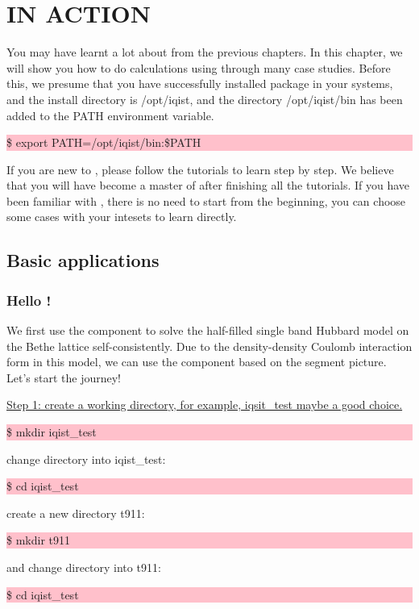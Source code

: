 \chapter{{\iqist} IN ACTION}
You may have learnt a lot about \iqist from the previous chapters. In this chapter, we will show you how to do calculations using \iqist through many case studies. Before this, we presume that you have successfully installed \iqist package in your systems, and the install directory is /opt/iqist, and the directory /opt/iqist/bin has been added to the PATH environment variable.

\noindent\colorbox{pink}{\parbox[r]{\linewidth}{\quad \$ export PATH=/opt/iqist/bin:\$PATH }}

If you are new to \iqist, please follow the tutorials to learn step by step. We believe that you will have become a master of \iqist after finishing all the tutorials. If you have been familiar with \iqist, there is no need to start from the beginning, you can choose some cases with your intesets to learn directly.

\section{Basic applications}
\subsection{Hello {\iqist}!}
We first use the \azalea component to solve the half-filled single band Hubbard model on the Bethe lattice self-consistently. Due to the density-density Coulomb interaction form in this model, we can use the \azalea component based on the segment picture. Let's start the journey!

\underline{Step 1: create a working directory, for example, iqsit\_test maybe a good choice.}

\noindent\colorbox{pink}{\parbox[r]{\linewidth}{\quad \$ mkdir iqist\_test }}

change directory into iqist\_test:

\noindent\colorbox{pink}{\parbox[r]{\linewidth}{\quad \$ cd iqist\_test }}

create a new directory t911:

\noindent\colorbox{pink}{\parbox[r]{\linewidth}{\quad \$ mkdir t911 }}

and change directory into t911:

\noindent\colorbox{pink}{\parbox[r]{\linewidth}{\quad \$ cd iqist\_test }}

